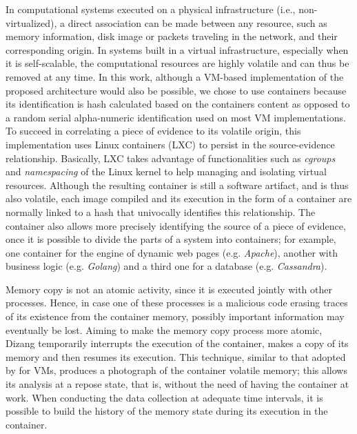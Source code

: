 \documentclass[conference]{IEEEtran}
\newcommand{\marcos}[1]{{\color{green}{MARCOS: #1}}}
\newcommand{\fancyname}{Dizang }
\begin{document}
In computational systems executed on a physical infrastructure (i.e., non-virtualized), a direct association can be made between any resource, such as memory information, disk image or packets traveling in the network, and their corresponding origin.
%
In systems built in a virtual infrastructure, especially when it is self-scalable, the computational resources are highly volatile and can thus be removed at any time.
%
In this work, although a VM-based implementation of the proposed architecture would also be possible, we chose to use containers because its identification is hash calculated based on the containers content as opposed to a random serial alpha-numeric identification used on most VM implementations.
%
\marcos{Dizer aqui que focamos em conteineres por ser mais fácil rotulá-los de forma única. A frase original era (e precisa ser mudada para melhorar o contexto: In this work, we focus primarily on containers for our implementation of \fancyname, although a VM-based implementation of the proposed architecture would also be possible - Hamilton: Done, o que acha? (acredito que precisa de uma referência certo?}
%
To succeed in correlating a piece of evidence to its volatile origin, this implementation uses Linux containers (LXC) to persist in the source-evidence relationship.
%
Basically, LXC takes advantage of functionalities such as \textit{cgroups} and \textit{namespacing} of the Linux kernel to help managing and isolating virtual resources.
%
Although the resulting container is still a software artifact, and is thus also volatile, each image compiled and its execution in the form of a container are normally linked to a hash that univocally identifies this relationship.
%
The container also allows more precisely identifying the source of a piece of evidence, once it is possible to divide the parts of a system into containers; for example, one container for the engine of dynamic web pages (e.g. \textit{Apache}), another with business logic (e.g. \textit{Golang}) and a third one for a database (e.g. \textit{Cassandra}).


Memory copy is not an atomic activity, since it is executed jointly with other processes.
%
Hence, in case one of these processes is a malicious code erasing traces of its existence from the container memory, possibly important information may eventually be lost. 
%
Aiming to make the memory copy process more atomic, \fancyname temporarily interrupts the execution of the container, makes a copy of its memory and then resumes its execution. 
%
This technique, similar to that adopted by \cite{Rafique_Static_Live_Digital_Forensics:2013} for VMs, produces a photograph of the container volatile memory; this allows its analysis at a repose state, that is, without the need of having the container at work.
%
When conducting the data collection at adequate time intervals, it is possible to build the history of the memory state during its execution in the container.
%
\end{document}
